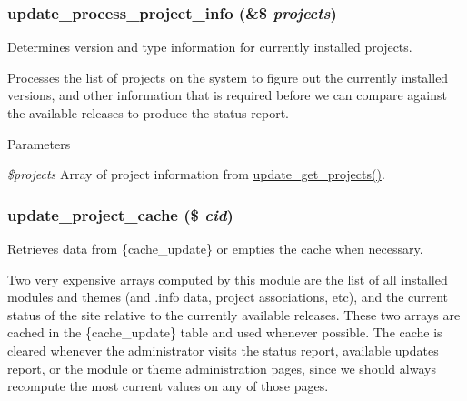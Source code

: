 \hypertarget{update_8compare_8inc_ad14173209d3e9cf76fbd6d6d1977de05}{
\subsubsection[{update\_\-process\_\-project\_\-info}]{\setlength{\rightskip}{0pt plus 5cm}update\_\-process\_\-project\_\-info (\&\$ {\em projects})}}
\label{update_8compare_8inc_ad14173209d3e9cf76fbd6d6d1977de05}
Determines version and type information for currently installed projects.

Processes the list of projects on the system to figure out the currently installed versions, and other information that is required before we can compare against the available releases to produce the status report.


\begin{DoxyParams}{Parameters}
\item[{\em \$projects}]Array of project information from \hyperlink{update_8compare_8inc_a7e1ea49d91f2d2b81b8101d481d10300}{update\_\-get\_\-projects()}. \end{DoxyParams}
\hypertarget{update_8compare_8inc_a958705ecce49b020722280decff3f644}{
\subsubsection[{update\_\-project\_\-cache}]{\setlength{\rightskip}{0pt plus 5cm}update\_\-project\_\-cache (\$ {\em cid})}}
\label{update_8compare_8inc_a958705ecce49b020722280decff3f644}
Retrieves data from \{cache\_\-update\} or empties the cache when necessary.

Two very expensive arrays computed by this module are the list of all installed modules and themes (and .info data, project associations, etc), and the current status of the site relative to the currently available releases. These two arrays are cached in the \{cache\_\-update\} table and used whenever possible. The cache is cleared whenever the administrator visits the status report, available updates report, or the module or theme administration pages, since we should always recompute the most current values on any of those pages.

